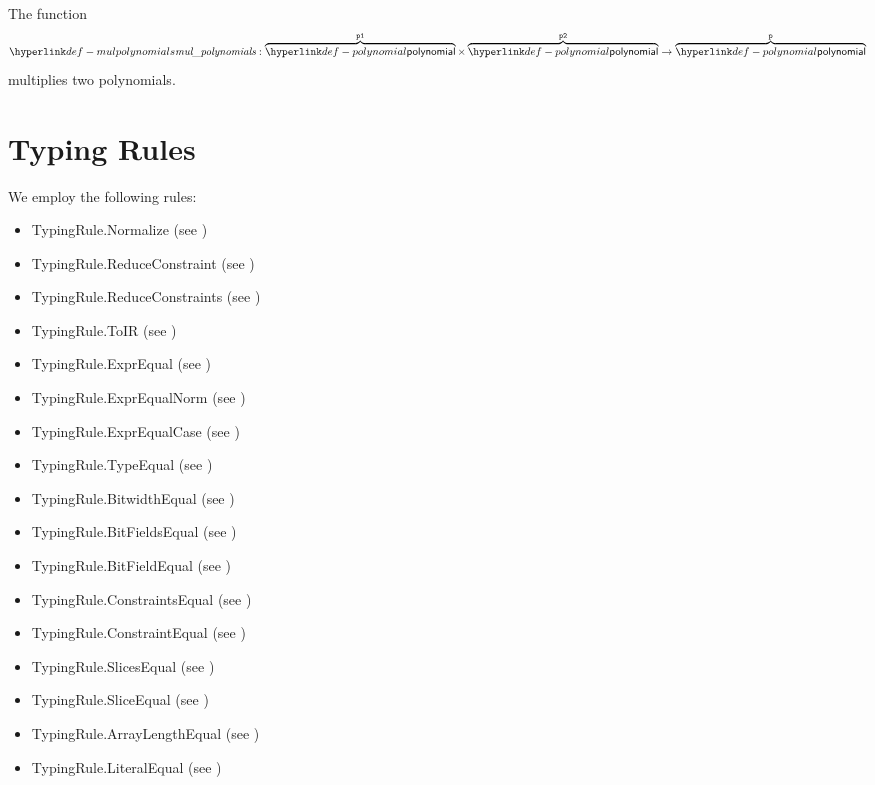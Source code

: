 The function
\[
  \mulpolynomials : \overname{\polynomial}{\vpone} \times \overname{\polynomial}{\vptwo} \rightarrow \overname{\polynomial}{\vp}
\]
multiplies two polynomials.
\begin{mathpar}
\end{mathpar}

\section{Typing Rules\label{sec:SymbolicReductionAndEquivalenceTestingRules}}
We employ the following rules:
\begin{itemize}
  \item TypingRule.Normalize (see )
  \item TypingRule.ReduceConstraint (see )
  \item TypingRule.ReduceConstraints (see )
  \item TypingRule.ToIR (see )
  \item TypingRule.ExprEqual (see )
  \item TypingRule.ExprEqualNorm (see )
  \item TypingRule.ExprEqualCase (see )
  \item TypingRule.TypeEqual (see )
  \item TypingRule.BitwidthEqual (see )
  \item TypingRule.BitFieldsEqual (see )
  \item TypingRule.BitFieldEqual (see )
  \item TypingRule.ConstraintsEqual (see )
  \item TypingRule.ConstraintEqual (see )
  \item TypingRule.SlicesEqual (see )
  \item TypingRule.SliceEqual (see )
  \item TypingRule.ArrayLengthEqual (see )
  \item TypingRule.LiteralEqual (see )
\end{itemize}


